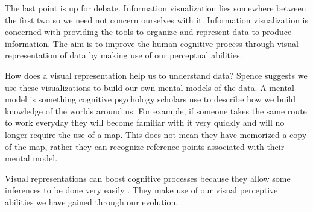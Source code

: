 \documentclass[a4paper, 10pt, titlepage]{article}
\begin{document}
The last point is up for debate. Information visualization lies somewhere between the first two so we need not concern ourselves with it. Information visualization is concerned with providing the tools to organize and represent data to produce information. The aim is to improve the human cognitive process through visual representation of data by making use of our perceptual abilities.

How does a visual representation help us to understand data? Spence \cite{spence2001information} suggests we use these visualizations to build our own mental models of the data. A mental model is something cognitive psychology scholars use to describe how we build knowledge of the worlds around us. For example, if someone takes the same route to work everyday they will become familiar with it very quickly and will no longer require the use of a map. This does not mean they have memorized a copy of the map, rather they can recognize reference points associated with their mental model.

Visual representations can boost cognitive processes because they allow some inferences to be done very easily \cite{card1999readings}. They make use of our visual perceptive abilities we have gained through our evolution.
\end{document}
